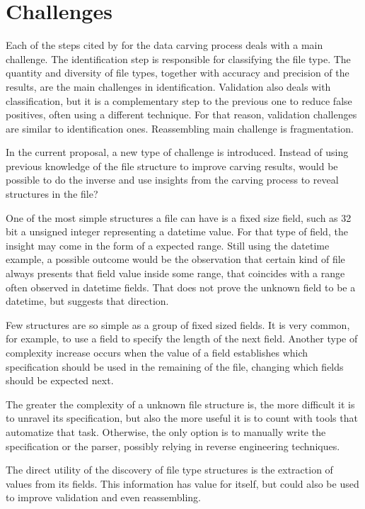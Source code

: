 \section{Challenges}

Each of the steps cited by \cite{ali_review_2018} for the data carving process deals with a main challenge. The identification step is responsible for classifying the file type. The quantity and diversity of file types, together with accuracy and precision of the results, are the main challenges in identification. Validation also deals with classification, but it is a complementary step to the previous one to reduce false positives, often using a different technique. For that reason, validation challenges are similar to identification ones. Reassembling main challenge is fragmentation.

In the current proposal, a new type of challenge is introduced. Instead of using previous knowledge of the file structure to improve carving results, would be possible to do the inverse and use insights from the carving process to reveal structures in the file?

One of the most simple structures a file can have is a fixed size field, such as 32 bit a unsigned integer representing a datetime value. For that type of field, the insight may come in the form of a expected range. Still using the datetime example, a possible outcome would be the observation that certain kind of file always presents that field value inside some range, that coincides with a range often observed in datetime fields. That does not prove the unknown field to be a datetime, but suggests that direction.

Few structures are so simple as a group of fixed sized fields. It is very common, for example, to use a field to specify the length of the next field. Another type of complexity increase occurs when the value of a field establishes which specification should be used in the remaining of the file, changing which fields should be expected next.

The greater the complexity of a unknown file structure is, the more difficult it is to unravel its specification, but also the more useful it is to count with tools that automatize that task. Otherwise, the only option is to manually write the specification or the parser, possibly relying in reverse engineering techniques.

The direct utility of the discovery of file type structures is the extraction of values from its fields. This information has value for itself, but could also be used to improve validation and even reassembling. 
